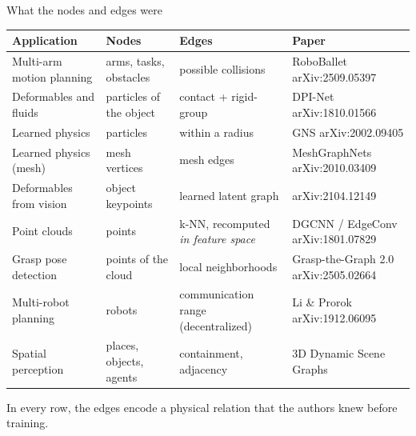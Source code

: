 \documentclass[aspectratio=169,11pt]{beamer}
\newcommand{\arx}[1]{{\scriptsize\color{dim}arXiv:#1}}
\begin{document}
\begin{frame}{What the nodes and edges were}
  \vspace{-0.5em}
  \centering
  \scriptsize
  \setlength{\tabcolsep}{4pt}
  \renewcommand{\arraystretch}{1.0}
  \begin{tabular}{@{}>{\raggedright\arraybackslash}p{3.15cm}
                    >{\raggedright\arraybackslash}p{2.50cm}
                    >{\raggedright\arraybackslash}p{2.95cm}
                    >{\raggedright\arraybackslash}p{4.10cm}@{}}
    \toprule
    \textbf{Application} & \textbf{Nodes} & \textbf{Edges} & \textbf{Paper} \\
    \midrule
    Multi-arm motion planning & arms, tasks, obstacles & possible collisions
      & RoboBallet \arx{2509.05397} \\
    Deformables and fluids & particles of the object & contact + rigid-group
      & DPI-Net \arx{1810.01566} \\
    Learned physics & particles & within a radius
      & GNS \arx{2002.09405} \\
    Learned physics (mesh) & mesh vertices & mesh edges
      & MeshGraphNets \arx{2010.03409} \\
    Deformables from vision & object keypoints & learned latent graph
      & \arx{2104.12149} \\
    Point clouds & points & k-NN, recomputed \emph{in feature space}
      & DGCNN / EdgeConv \arx{1801.07829} \\
    Grasp pose detection & points of the cloud & local neighborhoods
      & Grasp-the-Graph 2.0 \arx{2505.02664} \\
    Multi-robot planning & robots & communication range (decentralized)
      & Li \& Prorok \arx{1912.06095} \\
    Spatial perception & places, objects, agents & containment, adjacency
      & 3D Dynamic Scene Graphs\newline\arx{2002.06289} \\
    \bottomrule
  \end{tabular}
  \vspace{0.5em}

  \footnotesize
  \alert{In every row, the edges encode a physical relation that the authors
  knew before training.}
\end{frame}
\end{document}

